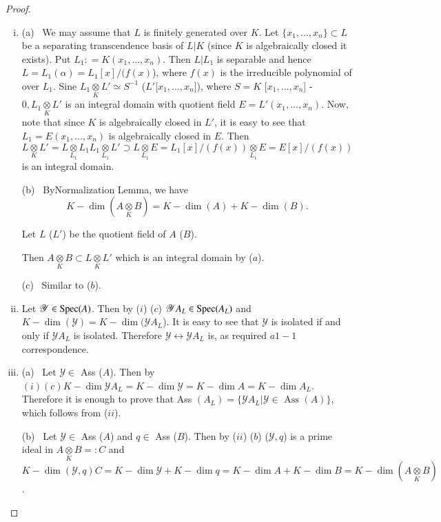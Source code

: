 \begin{proof}%
\begin{enumerate}[(i)]
\item
  (a)~  We may assume that $L$ is finitely generated over $K$. Let $\{
    x_1, \ldots, x_n \} \subset L$ be a separating transcendence basis of
    $L|K$ (since $K$ is algebraically closed it exists). Put $L_1:  =
    K(x_1, \ldots, x_n)$. Then $L|L_1$ is separable and hence $L = L_1
    (\alpha) = L_1 [x]/(f(x)$), where $f(x)$ is the irreducible
    polynomial of over $L_1$. Sine $L_1 \underset{K}{\otimes} L' \simeq
    S^{-1 }$ ($L'$[$x_1, \ldots, x_n$]), where $S=K$ [$x_1, \ldots,
      x_n$] - $0, L_1 \underset{K}{\otimes} L'$ is an integral domain
    with quotient field $E = L' (x_1, \ldots, x_n)$. Now, note that
    since $K$ is algebraically closed in $L'$, it is easy to see that
    $L_1 = E(x_1, \ldots, x_n)$ is algebraically closed in $E$. Then $L
    \underset{K}{\otimes} L' = L \underset{L_1}{\otimes} L_1 L_1
    \underset{L_1}{\otimes} L'\supset L \underset{L_1}{\otimes} E =
    L_1 [x]/(f(x))
    \underset{L_1}{\otimes} E = E[x] /(f(x))$ is an integral domain. 

  (b)~  By\pageoriginale Normalization Lemma, we have
    $$
    K-\dim (A \underset{K}{\otimes} B) = K-\dim (A) + K-\dim (B).
    $$

    Let $L$ (\resp  $L'$) be the quotient field of $A$ (\resp  $B$). 

    Then $A \underset{K}{\otimes} B \subset L \underset{K}{\otimes}
    L'$ which is an integral domain by ($a$). 

  (c)~ Similar to ($b$).
\item Let $\mathscr{Y} \in \operatorname{Spec} (A)$. Then by ($i$) ($c$)
  $\mathscr{Y} A_L \in \operatorname{Spec} (A_L)$ and $K-\dim (\mathscr{Y})
  = K-\dim (\mathscr{Y} A_L$). It is easy to see that $\mathscr{Y}$ is
  isolated if and only if $\mathscr{Y} A_L$ is isolated. Therefore
  $\mathscr{Y} \leftrightarrow \mathscr{Y} A_L$  is, as required $a
  1-1$ correspondence. 
\item 
  (a)~ Let $\mathscr{Y} \in$ Ass ($A$). Then by $(i) (c)
    K-\dim \mathscr{Y} A_L = K-\dim \mathscr{Y}= K-\dim A= K-\dim 
    A_L$. Therefore it is enough to prove that Ass $(A_L) = \{
    \mathscr{Y} A_L | \mathscr{Y} \in \text { Ass } (A) \}$,
    which follows from ($ii$). 

  (b)~ Let $\mathscr{Y} \in$ Ass ($A$) and $q \in $
    Ass ($B$). Then by ($ii$) ($b$) ($\mathscr{Y}, q$) is a prime
    ideal in  $A \underset{K}{\otimes} B =:  C$ and  $K-\dim
    (\mathscr{Y}, q) C=K-\dim \mathscr{Y}+K-\dim q=K-\dim A+K-\dim
    B=K-\dim (A \underset{K}{\otimes} B)$. 


\end{enumerate}
\end{proof}
